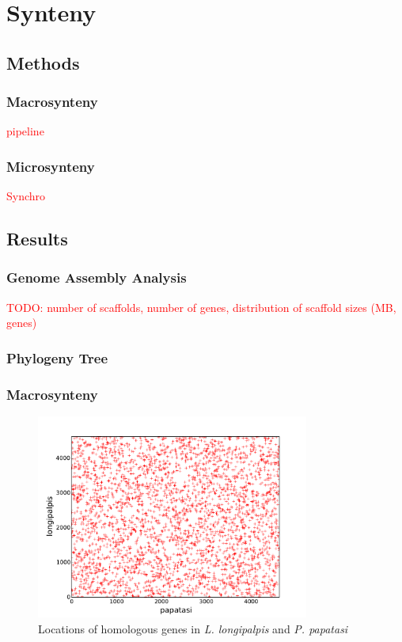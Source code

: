 \section{Synteny}

\subsection{Methods}

\subsubsection{Macrosynteny}
\textcolor{red}{pipeline}

\subsubsection{Microsynteny}
\textcolor{red}{Synchro}

\subsection{Results}

\subsubsection{Genome Assembly Analysis}

\textcolor{red}{TODO: number of scaffolds, number of genes, distribution of scaffold sizes (MB, genes)}

\subsubsection{Phylogeny Tree}

\subsubsection{Macrosynteny}

\begin{figure}[h!]
  \centering
    \includegraphics[width=0.8\textwidth]{figures/synteny/papatasi_longipalpis_plot}
  \caption{Locations of homologous genes in \emph{L. longipalpis} and \emph{P. papatasi}}
\end{figure}


